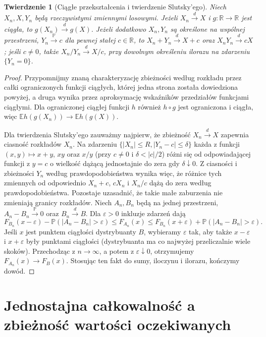 \documentclass[11pt,a4paper,oneside]{report}
\numberwithin{equation}{chapter}
\theoremstyle{plain}
\newtheorem{twierdzenie}{Twierdzenie}[chapter]
\theoremstyle{definition}
\theoremstyle{remark}
\newcommand{\R}{\mathbb{R}}
\newcommand{\Prob}{\mathbb{P}}
\newcommand{\E}{\mathbb{E}}
\begin{document}
\begin{twierdzenie}[Ciągłe przekształcenia i twierdzenie Slutsky'ego]
Niech $X_n,X,Y_n$ będą rzeczywistymi zmiennymi losowymi.
Jeżeli $X_n\xrightarrow{d}X$ i $g:\R\to\R$ jest ciągła,
to $g(X_n)\xrightarrow{d}g(X)$.
Jeżeli dodatkowo $X_n,Y_n$ są określone na wspólnej
przestrzeni, $Y_n\xrightarrow{\Prob}c$ dla pewnej stałej
$c\in\R$, to
$X_n+Y_n\xrightarrow{d}X+c$ oraz
$X_nY_n\xrightarrow{d}cX$; jeśli $c\ne0$, także
$X_n/Y_n\xrightarrow{d}X/c$, przy dowolnym określeniu
ilorazu na zdarzeniu $\{Y_n=0\}$.
\end{twierdzenie}
\begin{proof}
Przypomnijmy znaną charakteryzację zbieżności
według rozkładu przez całki ograniczonych funkcji
ciągłych, której jedna strona została dowiedziona
powyżej, a druga wynika przez aproksymację
wskaźników przedziałów funkcjami ciągłymi.
Dla ograniczonej ciągłej funkcji $h$ również
$h\circ g$ jest ograniczona i ciągła, więc
$\E h(g(X_n))\to\E h(g(X))$.

Dla twierdzenia Slutsky'ego zauważmy najpierw,
że zbieżność $X_n\xrightarrow d X$ zapewnia ciasność
rozkładów $X_n$. Na zdarzeniu $\{|X_n|\leq R,
|Y_n-c|\leq\delta\}$ każda z funkcji
$(x,y)\mapsto x+y$, $xy$ oraz $x/y$ (przy $c\ne0$
i $\delta<|c|/2$) różni się od odpowiadającej
funkcji z $y=c$ o wielkość dążącą jednostajnie do zera
gdy $\delta\downarrow0$. Z ciasności i zbieżności
$Y_n$ według prawdopodobieństwa wynika więc, że
różnice tych zmiennych od odpowiednio
$X_n+c$, $cX_n$ i $X_n/c$ dążą do zera według
prawdopodobieństwa. Pozostaje uzasadnić, że takie małe zaburzenia
nie zmieniają granicy rozkładów. Niech $A_n,B_n$
będą na jednej przestrzeni, $A_n-B_n\xrightarrow{\Prob}0$
oraz $B_n\xrightarrow d B$. Dla $\varepsilon>0$
inkluzje zdarzeń dają
\[
F_{B_n}(x-\varepsilon)-\Prob(|A_n-B_n|>\varepsilon)
\leq F_{A_n}(x)
\leq F_{B_n}(x+\varepsilon)+\Prob(|A_n-B_n|>\varepsilon).
\]
Jeśli $x$ jest punktem ciągłości dystrybuanty $B$,
wybieramy $\varepsilon$ tak, aby także
$x-\varepsilon$ i $x+\varepsilon$ były punktami
ciągłości (dystrybuanta ma co najwyżej przeliczalnie
wiele skoków). Przechodząc z $n\to\infty$, a potem
z $\varepsilon\downarrow0$, otrzymujemy
$F_{A_n}(x)\to F_B(x)$. Stosując ten fakt do
sumy, iloczynu i ilorazu, kończymy dowód.
\end{proof}

\section{Jednostajna całkowalność a zbieżność wartości oczekiwanych}
\end{document}
